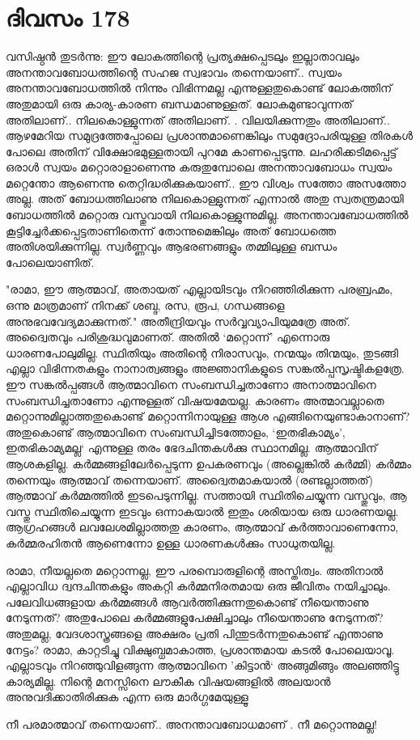 \section{ദിവസം 178}


വസിഷ്ഠൻ തുടർന്നു: ഈ ലോകത്തിന്റെ പ്രത്യക്ഷപ്പെടലും ഇല്ലാതാവലും അനന്താവബോധത്തിന്റെ സഹജ സ്വഭാവം തന്നെയാണ്‌.. സ്വയം അനന്താവബോധത്തിൽ നിന്നും വിഭിന്നമല്ല എന്നുള്ളതുകൊണ്ട് ലോകത്തിന്‌ അതുമായി ഒരു കാര്യ-കാരണ ബന്ധമാണുള്ളത്. ലോകമുണ്ടാവുന്നത് അതിലാണ്‌.. നിലകൊള്ളുന്നത് അതിലാണ്‌. . വിലയിക്കുന്നതും അതിലാണ്‌.. ആഴമേറിയ സമുദ്രത്തേപ്പോലെ പ്രശാന്തമാണെങ്കിലും സമുദ്രോപരിയുള്ള തിരകൾ പോലെ അതിന്‌ വിക്ഷോഭമുള്ളതായി പുറമേ കാണപ്പെടുന്നു. ലഹരിക്കടിമപ്പെട്ട് ഒരാൾ സ്വയം മറ്റൊരാളാണെന്നു കരുതുമ്പോലെ അനന്താവബോധം സ്വയം  മറ്റെന്തോ ആണെന്നു തെറ്റിദ്ധരിക്കുകയാണ്‌.. ഈ വിശ്വം സത്തോ അസത്തോ അല്ല. അത് ബോധത്തിലാണു നിലകൊള്ളുന്നത് എന്നാൽ അതു സ്വതന്ത്രമായി ബോധത്തിൽ മറ്റൊരു  വസ്തുവായി നിലകൊള്ളുന്നുമില്ല. അനന്താവബോധത്തിൽ കൂട്ടിച്ചേർക്കപ്പെട്ടതാണിതെന്ന് തോന്നുമെങ്കിലും അത് ബോധത്തെ അതിശയിക്കുന്നില്ല. സ്വർണ്ണവും ആഭരണങ്ങളും തമ്മിലുള്ള ബന്ധം പോലെയാണിത്.

"രാമാ, ഈ ആത്മാവ്, അതായത് എല്ലായിടവും നിറഞ്ഞിരിക്കുന്ന പരബ്രഹ്മം, ഒന്നു മാത്രമാണ്‌ നിനക്ക് ശബ്ദ, രസ, രൂപ, ഗന്ധങ്ങളെ അനുഭവവേദ്യമാക്കുന്നത്." അതീന്ദ്രിയവും സർവ്വവ്യാപിയുമത്രേ അത്. അദ്വൈതവും പരിശുദ്ധവുമാണത്. അതിൽ ‘മറ്റൊന്ന്’ എന്നൊരു ധാരണപോലുമില്ല. സ്ഥിതിയും അതിന്റെ നിരാസവും, നന്മയും തിന്മയും, തുടങ്ങി എല്ലാ വിഭിന്നതകളും നാനാത്വങ്ങളും അജ്ഞാനികളുടെ സങ്കൽപ്പസൃഷ്ടികളത്രേ. ഈ സങ്കൽപ്പങ്ങൾ ആത്മാവിനെ സംബന്ധിച്ചതാണോ അനാത്മാവിനെ സംബന്ധിച്ചതാണോ എന്നുള്ളത് വിഷയമേയല്ല. കാരണം അത്മാവല്ലാതെ മറ്റൊന്നുമില്ലാത്തതുകൊണ്ട് മറ്റൊന്നിനായുള്ള ആശ എങ്ങിനെയുണ്ടാകാനാണ്‌? അതുകൊണ്ട് ആത്മാവിനെ സംബന്ധിച്ചിടത്തോളം, ‘ഇതഭികാമ്യം’, ഇതഭികാമ്യമല്ല‘ എന്നുള്ള തരം ഭേദചിന്തകൾക്കു സ്ഥാനമില്ല. ആത്മാവിന് ആശകളില്ല. കർമ്മങ്ങളിലേർപ്പെടുന്ന ഉപകരണവും (അല്ലെങ്കിൽ കർമ്മി) കർമ്മം തന്നെയും ആത്മാവ് തന്നെയാണ്. അദ്വൈതമാകയാൽ (രണ്ടല്ലാത്തത്) ആത്മാവ് കർമ്മത്തിൽ ഇടപെടുന്നില്ല. സത്തായി സ്ഥിതിചെയ്യുന്ന വസ്തുവും, ആ വസ്തു സ്ഥിതിചെയ്യുന്ന ഇടവും ഒന്നാകയാൽ ഇതും ശരിയായ ഒരു ധാരണയല്ല. ആഗ്രഹങ്ങൾ ലവലേശമില്ലാത്തതു കാരണം, ആത്മാവ് കർത്താവാണെന്നോ, കർമ്മരഹിതൻ ആണെന്നോ ഉള്ള ധാരണകൾക്കും സാധുതയില്ല.

രാമാ, നീയല്ലതെ മറ്റൊന്നല്ല, ഈ പരമ്പൊരുളിന്റെ അസ്തിത്വം. അതിനാൽ എല്ലാവിധ ദ്വന്ദചിന്തകളും അകറ്റി കർമ്മനിരതമായ ഒരു ജീവിതം നയിച്ചാലും. പലേവിധങ്ങളായ കർമ്മങ്ങൾ ആവർത്തിക്കുന്നതുകൊണ്ട് നീയെന്താണു നേടുന്നത്? അതുപോലെ കർമ്മങ്ങളുപേക്ഷിച്ചാലും നീയെന്താണു നേടുന്നത്? അതുമല്ല, വേദശാസ്ത്രങ്ങളെ അക്ഷരം പ്രതി പിന്തുടർന്നതുകൊണ്ട് എന്താണു നേട്ടം? രാമാ, കാറ്റടിച്ചു വിക്ഷുബ്ധമാകാത്ത, പ്രശാന്തമായ കടൽ പോലെയാവൂ. എല്ലാടവും നിറഞ്ഞുവിളങ്ങുന്ന ആത്മാവിനെ ’കിട്ടാൻ‘ അങ്ങുമിങ്ങും അലഞ്ഞിട്ടു കാര്യമില്ല. നിന്റെ മനസ്സിനെ ലൗകീക വിഷയങ്ങളിൽ അലയാൻ അനുവദിക്കാതിരിക്കുക എന്ന ഒരു മാര്‍ഗ്ഗമേയുള്ളൂ

നീ പരമാത്മാവ് തന്നെയാണ്‌.. അനന്താവബോധമാണ്‌ . നീ മറ്റൊന്നുമല്ല! 

